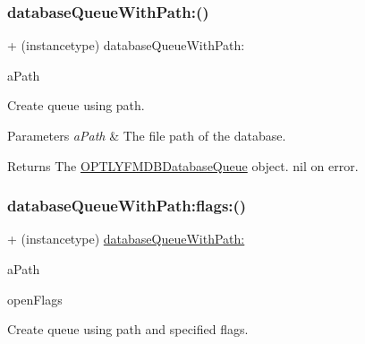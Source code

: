\subsubsection{\texorpdfstring{database\+Queue\+With\+Path\+:()}{databaseQueueWithPath:()}}
{\footnotesize\ttfamily + (instancetype) database\+Queue\+With\+Path\+: \begin{DoxyParamCaption}\item[{(N\+S\+String $\ast$\+\_\+\+Nullable)}]{a\+Path }\end{DoxyParamCaption}}

Create queue using path.


\begin{DoxyParams}{Parameters}
{\em a\+Path} & The file path of the database.\\
\hline
\end{DoxyParams}
\begin{DoxyReturn}{Returns}
The {\ttfamily \mbox{\hyperlink{interface_o_p_t_l_y_f_m_d_b_database_queue}{O\+P\+T\+L\+Y\+F\+M\+D\+B\+Database\+Queue}}} object. {\ttfamily nil} on error. 
\end{DoxyReturn}
\mbox{\label{interface_o_p_t_l_y_f_m_d_b_database_queue_a04d59bdf3e5e66955ead0ee7cd39bae7}} 
\subsubsection{\texorpdfstring{database\+Queue\+With\+Path\+:flags\+:()}{databaseQueueWithPath:flags:()}}
{\footnotesize\ttfamily + (instancetype) \mbox{\hyperlink{interface_o_p_t_l_y_f_m_d_b_database_queue_a70c1b4d9fba1dec4e6b6e1d19df6d7d9}{database\+Queue\+With\+Path\+:}} \begin{DoxyParamCaption}\item[{(N\+S\+String $\ast$\+\_\+\+Nullable)}]{a\+Path }\item[{flags:(int)}]{open\+Flags }\end{DoxyParamCaption}}

Create queue using path and specified flags.


